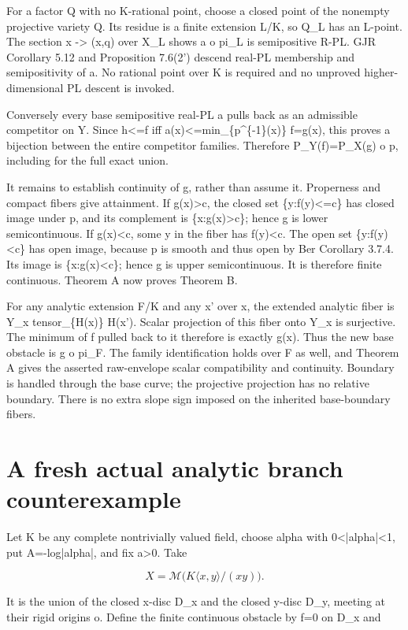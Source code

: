 \documentclass[11pt]{article}
\begin{document}
For a factor Q with no K-rational point, choose a closed point of the nonempty projective variety Q. Its residue is a finite extension L/K, so Q\_L has an L-point. The section x -> (x,q) over X\_L shows a o pi\_L is semipositive R-PL. GJR Corollary 5.12 and Proposition 7.6(2') descend real-PL membership and semipositivity of a. No rational point over K is required and no unproved higher-dimensional PL descent is invoked.

Conversely every base semipositive real-PL a pulls back as an admissible competitor on Y. Since h<=f iff a(x)<=min\_\{p\textasciicircum{}\{-1\}(x)\} f=g(x), this proves a bijection between the entire competitor families. Therefore P\_Y(f)=P\_X(g) o p, including for the full exact union.

It remains to establish continuity of g, rather than assume it. Properness and compact fibers give attainment. If g(x)>c, the closed set \{y:f(y)<=c\} has closed image under p, and its complement is \{x:g(x)>c\}; hence g is lower semicontinuous. If g(x)<c, some y in the fiber has f(y)<c. The open set \{y:f(y)<c\} has open image, because p is smooth and thus open by Ber Corollary 3.7.4. Its image is \{x:g(x)<c\}; hence g is upper semicontinuous. It is therefore finite continuous. Theorem A now proves Theorem B.

For any analytic extension F/K and any x' over x, the extended analytic fiber is Y\_x tensor\_\{H(x)\} H(x'). Scalar projection of this fiber onto Y\_x is surjective. The minimum of f pulled back to it therefore is exactly g(x). Thus the new base obstacle is g o pi\_F. The family identification holds over F as well, and Theorem A gives the asserted raw-envelope scalar compatibility and continuity. Boundary is handled through the base curve; the projective projection has no relative boundary. There is no extra slope sign imposed on the inherited base-boundary fibers.

\section{A fresh actual analytic branch counterexample}

Let K be any complete nontrivially valued field, choose alpha with 0<|alpha|<1, put A=-log|alpha|, and fix a>0. Take

\[
X=\mathcal M\bigl(K\langle x,y\rangle/(xy)\bigr).
\]

It is the union of the closed x-disc D\_x and the closed y-disc D\_y, meeting at their rigid origins o. Define the finite continuous obstacle by f=0 on D\_x and
\end{document}
